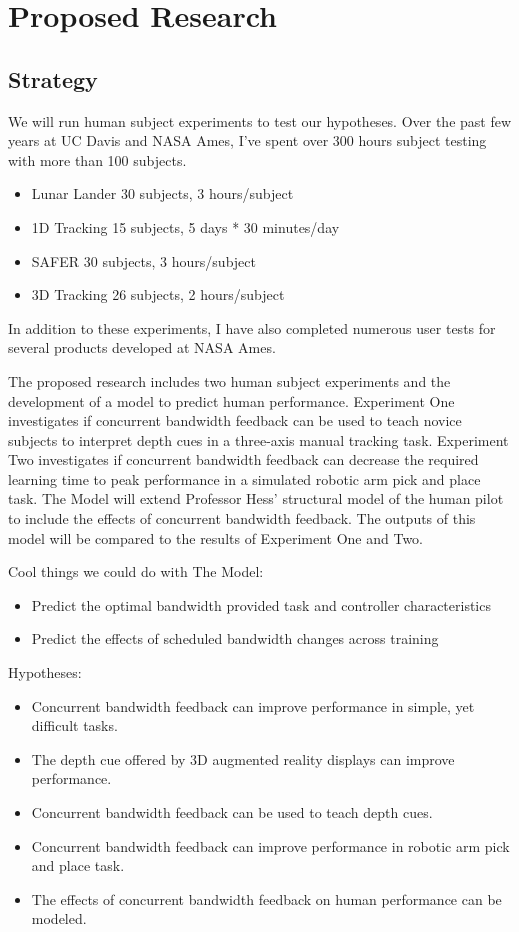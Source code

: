 \documentclass[float=false, crop=false]{standalone}
\begin{document}
\section{Proposed Research}
\subsection{Strategy}
We will run human subject experiments to test our hypotheses. Over the past few years at UC Davis and NASA Ames, I’ve spent over 300 hours subject testing with more than 100 subjects.

\begin{itemize}
\item Lunar Lander      30 subjects, 3 hours/subject
\item 1D Tracking       15 subjects, 5 days * 30 minutes/day
\item SAFER             30 subjects, 3 hours/subject
\item 3D Tracking       26 subjects, 2 hours/subject
\end{itemize}

In addition to these experiments, I have also completed numerous user tests for several products developed at NASA Ames.

The proposed research includes two human subject experiments and the development of a model to predict human performance. Experiment One investigates if concurrent bandwidth feedback can be used to teach novice subjects to interpret depth cues in a three-axis manual tracking task. Experiment Two investigates if concurrent bandwidth feedback can decrease the required learning time to peak performance in a simulated robotic arm pick and place task. The Model will extend Professor Hess’ structural model of the human pilot to include the effects of concurrent bandwidth feedback. The outputs of this model will be compared to the results of Experiment One and Two.

Cool things we could do with The Model:
\begin{itemize}
\item Predict the optimal bandwidth provided task and controller characteristics
\item Predict the effects of scheduled bandwidth changes across training
\end{itemize}

Hypotheses:
\begin{itemize}
\item Concurrent bandwidth feedback can improve performance in simple, yet difficult tasks.
\item The depth cue offered by 3D augmented reality displays can improve performance.
\item Concurrent bandwidth feedback can be used to teach depth cues.
\item Concurrent bandwidth feedback can improve performance in robotic arm pick and place task.
\item The effects of concurrent bandwidth feedback on human performance can be modeled.
\end{itemize}
\end{document}
